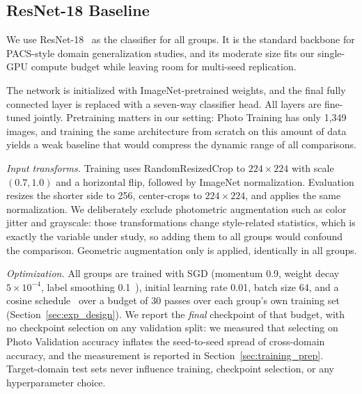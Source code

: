 \subsection{ResNet-18 Baseline}
\label{sec:resnet_baseline}

We use ResNet-18~\cite{he2016resnet} as the classifier for all groups. It is the standard backbone for PACS-style domain generalization studies, and its moderate size fits our single-GPU compute budget while leaving room for multi-seed replication.

The network is initialized with ImageNet-pretrained weights, and the final fully connected layer is replaced with a seven-way classifier head. All layers are fine-tuned jointly. Pretraining matters in our setting: Photo Training has only 1{,}349 images, and training the same architecture from scratch on this amount of data yields a weak baseline that would compress the dynamic range of all comparisons.

\textit{Input transforms.} Training uses RandomResizedCrop to $224\times224$ with scale $(0.7, 1.0)$ and a horizontal flip, followed by ImageNet normalization. Evaluation resizes the shorter side to 256, center-crops to $224\times224$, and applies the same normalization. We deliberately exclude photometric augmentation such as color jitter and grayscale: those transformations change style-related statistics, which is exactly the variable under study, so adding them to all groups would confound the comparison. Geometric augmentation only is applied, identically in all groups.

\textit{Optimization.} All groups are trained with SGD (momentum 0.9, weight decay $5\times10^{-4}$, label smoothing 0.1~\cite{szegedy2016rethinking}), initial learning rate 0.01, batch size 64, and a cosine schedule~\cite{loshchilov2017sgdr} over a budget of 30 passes over each group's own training set (Section~\ref{sec:exp_design}). We report the \textit{final} checkpoint of that budget, with no checkpoint selection on any validation split: we measured that selecting on Photo Validation accuracy inflates the seed-to-seed spread of cross-domain accuracy, and the measurement is reported in Section~\ref{sec:training_prep}. Target-domain test sets never influence training, checkpoint selection, or any hyperparameter choice.


